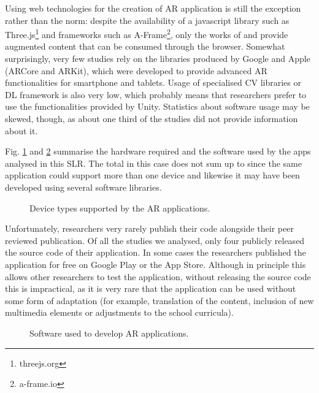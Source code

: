 Using web technologies for the creation of AR application is still the exception rather than the norm: despite the availability of a javascript library such as Three.js\footnote{threejs.org} and frameworks such as A-Frame\footnote{a-frame.io}, only the works of \citet{abriata2020building} and \citet{protopsaltis2016quiz} provide augmented content that can be consumed through the browser.
Somewhat surprisingly, very few studies rely on the libraries produced by Google and Apple (ARCore and ARKit), which were developed to provide advanced \gls{AR} functionalities for smartphone and tablets. Usage of specialised \gls{CV} libraries or \gls{DL} framework is also very low, which probably means that researchers prefer to use the functionalities provided by Unity. Statistics about software usage may be skewed, though, as about one third of the studies did not provide information about it.

Fig. \ref{fig:hardware} and \ref{fig:software} summarise the hardware required and the software used by the apps analysed in this \gls{SLR}. The total in this case does not sum up to \papersSelected since the same application could support more than one device and likewise it may have been developed using several software libraries.

\begin{figure}[ht]	
	\begin{center}
	
	\caption{Device types supported by the AR applications.}
	\label{fig:hardware}
    \end{center}
\end{figure}

Unfortunately, researchers very rarely publish their code alongside their peer reviewed publication. Of all the studies we analysed, only four \citep{mylonas2019educational, laviole2018nectar, ManriqueJuan2017APA, abriata2020building} publicly released the source code of their application. In some cases the researchers published the application for free on Google Play or the App Store. Although in principle this allows other researchers to test the application, without releasing the source code this is impractical, as it is very rare that the application can be used without some form of adaptation (for example, translation of the content, inclusion of new multimedia elements or adjustments to the school curricula).

\begin{figure}[ht]	
	\begin{center}
	
	\caption{Software used to develop AR applications.}
	\label{fig:software}
    \end{center}
\end{figure}
